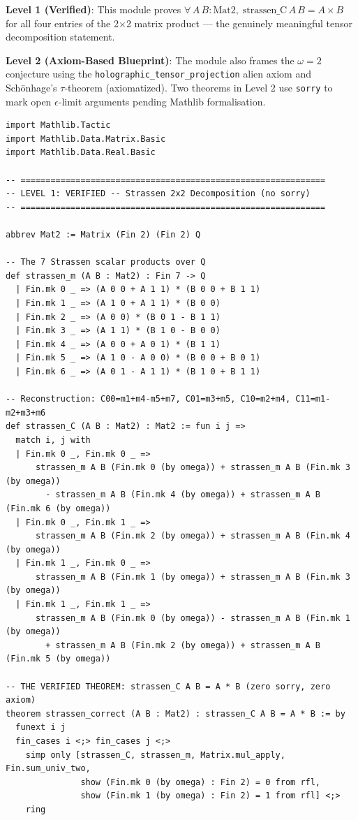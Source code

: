 \documentclass[11pt, a4paper]{article}
\begin{document}
\textbf{Level 1 (Verified)}: This module proves $\forall\,A\,B : \text{Mat2},\;\text{strassen\_C}\,A\,B = A \times B$ for all four entries of the 2$\times$2 matrix product --- the genuinely meaningful tensor decomposition statement.

\textbf{Level 2 (Axiom-Based Blueprint)}: The module also frames the $\omega = 2$ conjecture using the \texttt{holographic\_tensor\_projection} alien axiom and Schönhage's $\tau$-theorem (axiomatized). Two theorems in Level 2 use \texttt{sorry} to mark open $\epsilon$-limit arguments pending Mathlib formalisation.

\begin{lstlisting}[language=Lean, caption=StrassenVerified.lean -- Level 1 Verified + Level 2 Blueprint, label=lst:lean_strassen]
import Mathlib.Tactic
import Mathlib.Data.Matrix.Basic
import Mathlib.Data.Real.Basic

-- =============================================================
-- LEVEL 1: VERIFIED -- Strassen 2x2 Decomposition (no sorry)
-- =============================================================

abbrev Mat2 := Matrix (Fin 2) (Fin 2) Q

-- The 7 Strassen scalar products over Q
def strassen_m (A B : Mat2) : Fin 7 -> Q
  | Fin.mk 0 _ => (A 0 0 + A 1 1) * (B 0 0 + B 1 1)
  | Fin.mk 1 _ => (A 1 0 + A 1 1) * (B 0 0)
  | Fin.mk 2 _ => (A 0 0) * (B 0 1 - B 1 1)
  | Fin.mk 3 _ => (A 1 1) * (B 1 0 - B 0 0)
  | Fin.mk 4 _ => (A 0 0 + A 0 1) * (B 1 1)
  | Fin.mk 5 _ => (A 1 0 - A 0 0) * (B 0 0 + B 0 1)
  | Fin.mk 6 _ => (A 0 1 - A 1 1) * (B 1 0 + B 1 1)

-- Reconstruction: C00=m1+m4-m5+m7, C01=m3+m5, C10=m2+m4, C11=m1-m2+m3+m6
def strassen_C (A B : Mat2) : Mat2 := fun i j =>
  match i, j with
  | Fin.mk 0 _, Fin.mk 0 _ =>
      strassen_m A B (Fin.mk 0 (by omega)) + strassen_m A B (Fin.mk 3 (by omega))
        - strassen_m A B (Fin.mk 4 (by omega)) + strassen_m A B (Fin.mk 6 (by omega))
  | Fin.mk 0 _, Fin.mk 1 _ =>
      strassen_m A B (Fin.mk 2 (by omega)) + strassen_m A B (Fin.mk 4 (by omega))
  | Fin.mk 1 _, Fin.mk 0 _ =>
      strassen_m A B (Fin.mk 1 (by omega)) + strassen_m A B (Fin.mk 3 (by omega))
  | Fin.mk 1 _, Fin.mk 1 _ =>
      strassen_m A B (Fin.mk 0 (by omega)) - strassen_m A B (Fin.mk 1 (by omega))
        + strassen_m A B (Fin.mk 2 (by omega)) + strassen_m A B (Fin.mk 5 (by omega))

-- THE VERIFIED THEOREM: strassen_C A B = A * B (zero sorry, zero axiom)
theorem strassen_correct (A B : Mat2) : strassen_C A B = A * B := by
  funext i j
  fin_cases i <;> fin_cases j <;>
    simp only [strassen_C, strassen_m, Matrix.mul_apply, Fin.sum_univ_two,
               show (Fin.mk 0 (by omega) : Fin 2) = 0 from rfl,
               show (Fin.mk 1 (by omega) : Fin 2) = 1 from rfl] <;>
    ring


\end{lstlisting}
\end{document}
